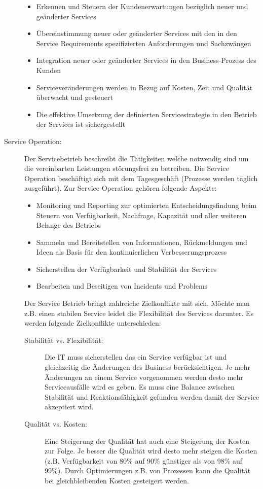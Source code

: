 \begin{description}
\begin{itemize}
		\item Erkennen und Steuern der Kundenerwartungen bezüglich neuer und geänderter Services
		\item Übereinstimmung neuer oder geänderter Services mit den in den Service Requirements spezifizierten Anforderungen und Sachzwängen
		\item Integration neuer oder geänderter Services in den Business-Prozess des Kunden
		\item Serviceveränderungen werden in Bezug auf Kosten, Zeit und Qualität überwacht und gesteuert
		\item Die effektive Umsetzung der definierten Servicestrategie in den Betrieb der Services ist sichergestellt
	\end{itemize}
	\item[Service Operation:] Der Servicebetrieb beschreibt die Tätigkeiten welche notwendig sind um die vereinbarten Leistungen störungsfrei zu betreiben. Die Service Operation beschäftigt sich mit dem Tagesgeschäft (Prozesse werden täglich ausgeführt). Zur Service Operation gehören folgende Aspekte:
	\begin{itemize}
		\item Monitoring und Reporting zur optimierten Entscheidungsfindung beim Steuern von Verfügbarkeit, Nachfrage, Kapazität und aller weiteren Belange des Betriebs
		\item Sammeln und Bereitstellen von Informationen, Rückmeldungen und Ideen als Basis für den kontinuierlichen Verbesserungsprozess
		\item Sicherstellen der Verfügbarkeit und Stabilität der Services
		\item Bearbeiten und Beseitigen von Incidents und Problems
	\end{itemize}
	Der Service Betrieb bringt zahlreiche Zielkonflikte mit sich. Möchte man z.B. einen stabilen Service leidet die Flexibilität des Services darunter. Es werden folgende Zielkonflikte unterschieden:
	\begin{description}
		\item[Stabilität vs. Flexibilität:] Die IT muss sicherstellen das ein Service verfügbar ist und gleichzeitig die Änderungen des Business berücksichtigen. Je mehr Änderungen an einem Service vorgenommen werden desto mehr Serviceausfälle wird es geben. Es muss eine Balance zwischen Stabilität und Reaktionsfähigkeit gefunden werden damit der Service akzeptiert wird.
		\item[Qualität vs. Kosten:] Eine Steigerung der Qualität hat auch eine Steigerung der Kosten zur Folge. Je besser die Qualität wird desto mehr steigen die Kosten (z.B. Verfügbarkeit von 80\% auf 90\% günstiger als von 98\% auf 99\%). Durch Optimierungen z.B. von Prozessen kann die Qualität bei gleichbleibenden Kosten gesteigert werden.

\end{description}
\end{description}
